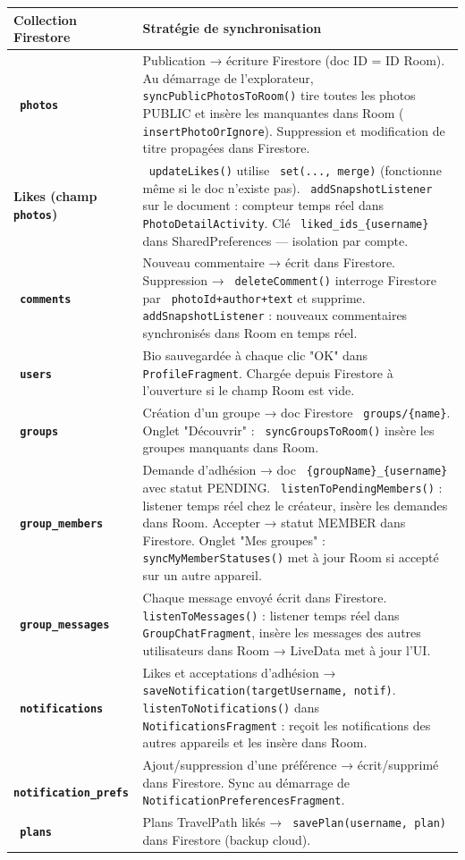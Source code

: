 \documentclass[a4paper,12pt,openany]{report}
\newcommand{\ic}[1]{\texttt{\small\colorbox{lightbg}{\color{navy!90} #1}}}
\begin{document}
\begin{tabularx}{\textwidth}{>{\bfseries}l X}
  \toprule
  Collection Firestore & Stratégie de synchronisation \\
  \midrule
  \ic{photos}
    & Publication → écriture Firestore (doc ID = ID Room).
      Au démarrage de l'explorateur, \ic{syncPublicPhotosToRoom()} tire toutes les photos
      PUBLIC et insère les manquantes dans Room (\ic{insertPhotoOrIgnore}).
      Suppression et modification de titre propagées dans Firestore. \\
  Likes (champ \ic{photos})
    & \ic{updateLikes()} utilise \ic{set(..., merge)} (fonctionne même si le doc n'existe pas).
      \ic{addSnapshotListener} sur le document : compteur temps réel dans \ic{PhotoDetailActivity}.
      Clé \ic{liked\_ids\_\{username\}} dans SharedPreferences — isolation par compte. \\
  \ic{comments}
    & Nouveau commentaire → écrit dans Firestore.
      Suppression → \ic{deleteComment()} interroge Firestore par \ic{photoId+author+text} et supprime.
      \ic{addSnapshotListener} : nouveaux commentaires synchronisés dans Room en temps réel. \\
  \ic{users}
    & Bio sauvegardée à chaque clic "OK" dans \ic{ProfileFragment}.
      Chargée depuis Firestore à l'ouverture si le champ Room est vide. \\
  \ic{groups}
    & Création d'un groupe → doc Firestore \ic{groups/\{name\}}.
      Onglet "Découvrir" : \ic{syncGroupsToRoom()} insère les groupes manquants dans Room. \\
  \ic{group\_members}
    & Demande d'adhésion → doc \ic{\{groupName\}\_\{username\}} avec statut PENDING.
      \ic{listenToPendingMembers()} : listener temps réel chez le créateur, insère les demandes dans Room.
      Accepter → statut MEMBER dans Firestore.
      Onglet "Mes groupes" : \ic{syncMyMemberStatuses()} met à jour Room si accepté sur un autre appareil. \\
  \ic{group\_messages}
    & Chaque message envoyé écrit dans Firestore.
      \ic{listenToMessages()} : listener temps réel dans \ic{GroupChatFragment},
      insère les messages des autres utilisateurs dans Room → LiveData met à jour l'UI. \\
  \ic{notifications}
    & Likes et acceptations d'adhésion → \ic{saveNotification(targetUsername, notif)}.
      \ic{listenToNotifications()} dans \ic{NotificationsFragment} : reçoit les notifications
      des autres appareils et les insère dans Room. \\
  \ic{notification\_prefs}
    & Ajout/suppression d'une préférence → écrit/supprimé dans Firestore.
      Sync au démarrage de \ic{NotificationPreferencesFragment}. \\
  \ic{plans}
    & Plans TravelPath likés → \ic{savePlan(username, plan)} dans Firestore (backup cloud). \\
  \bottomrule
\end{tabularx}
\end{document}
